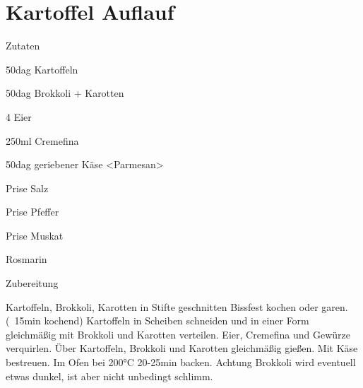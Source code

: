 \chapter*{Kartoffel Auflauf}
\begin{multicols}{2}
 {\Large Zutaten}
 \begin{Zutaten}
		\item 50dag Kartoffeln
		\item 50dag Brokkoli + Karotten
		\item 4 Eier
		\item 250ml Cremefina
		\item 50dag geriebener Käse <Parmesan>
		\item Prise Salz
		\item Prise Pfeffer
		\item Prise Muskat
		\item Rosmarin
		
		
			
				
\end{Zutaten}
	
\columnbreak
{}
\end{multicols}

{\Large Zubereitung} \newline
\begin{addmargin}[1cm]{0cm}
	Kartoffeln, Brokkoli, Karotten in Stifte geschnitten Bissfest kochen oder garen. (~15min kochend)\newline
	Kartoffeln in Scheiben schneiden und in einer Form gleichmäßig mit Brokkoli und Karotten verteilen.\newline
	Eier, Cremefina und Gewürze verquirlen.\newline
	Über Kartoffeln, Brokkoli und Karotten gleichmäßig gießen.
	Mit Käse bestreuen.\newline
	Im Ofen bei 200°C 20-25min backen.\newline
	Achtung Brokkoli wird eventuell etwas dunkel, ist aber nicht unbedingt schlimm.
		
\end{addmargin}
